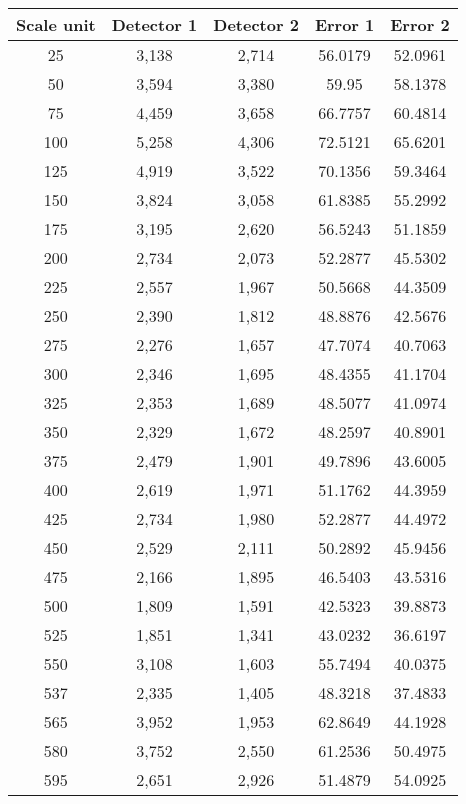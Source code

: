 \documentclass{article}
\begin{document}
\begin{table}
\centering
\begin{tabular}{|*{5}{c|}}
\hline
Scale unit &	Detector 1 & Detector 2 & Error 1 &	Error 2
\\[0.5ex]
\hline\hline 
25 & 	3,138 & 2,714 & 56.0179 & 52.0961 \\ \hline 
50 & 	3,594 & 3,380 & 59.95 & 58.1378 \\ \hline 
75 & 	4,459 & 3,658 & 66.7757 & 60.4814 \\ \hline 
100 & 	5,258 & 4,306 & 72.5121 & 65.6201 \\ \hline 
125 & 	4,919 & 3,522 & 70.1356 & 59.3464 \\ \hline 
150 & 	3,824 & 3,058 & 61.8385 & 55.2992 \\ \hline 
175 & 	3,195 & 2,620 & 56.5243 & 51.1859 \\ \hline 
200 & 	2,734 & 2,073 & 52.2877 & 45.5302 \\ \hline 
225 & 	2,557 & 1,967 & 50.5668 & 44.3509 \\ \hline 
250 & 	2,390 & 1,812 & 48.8876 & 42.5676 \\ \hline 
275 & 	2,276 & 1,657 & 47.7074 & 40.7063 \\ \hline 
300 & 	2,346 & 1,695 & 48.4355 & 41.1704 \\ \hline 
325 & 	2,353 & 1,689 & 48.5077 & 41.0974 \\ \hline 
350 & 	2,329 & 1,672 & 48.2597 & 40.8901 \\ \hline 
375 & 	2,479 & 1,901 & 49.7896 & 43.6005 \\ \hline 
400 & 	2,619 & 1,971 & 51.1762 & 44.3959 \\ \hline 
425 & 	2,734 & 1,980 & 52.2877 & 44.4972 \\ \hline 
450 & 	2,529 & 2,111 & 50.2892 & 45.9456 \\ \hline 
475 & 	2,166 & 1,895 & 46.5403 & 43.5316 \\ \hline 
500 & 	1,809 & 1,591 & 42.5323 & 39.8873 \\ \hline 
525 & 	1,851 & 1,341 & 43.0232 & 36.6197 \\ \hline 
550 & 	3,108 & 1,603 & 55.7494 & 40.0375 \\ \hline 
537 & 	2,335 & 1,405 & 48.3218 & 37.4833 \\ \hline 
565 & 	3,952 & 1,953 & 62.8649 & 44.1928 \\ \hline 
580 & 	3,752 & 2,550 & 61.2536 & 50.4975 \\ \hline 
595 & 	2,651 & 2,926 & 51.4879 & 54.0925 \\ \hline 

\end{tabular}
\end{table}
\end{document}
